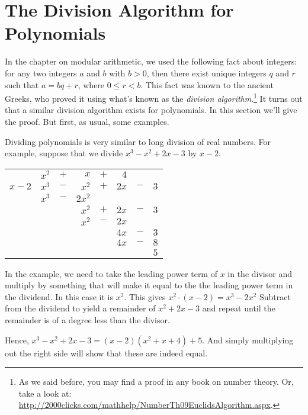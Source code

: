 \section{The Division Algorithm for Polynomials}
In the chapter on modular arithmetic, we used the following fact about integers: for any two integers $a$ and $b$  with $b > 0$, then there exist unique
integers $q$ and $r$ such that $a = bq+r$, where $0 \leq r < b$. This fact was known to the ancient Greeks, who proved it using what's known as the \emph{division algorithm}.\footnote{As we said before, you may find a proof in any book on number theory. Or, take a look at:  \url{http://2000clicks.com/mathhelp/NumberTh09EuclidsAlgorithm.aspx}.} It turns out that a similar
division algorithm exists for
polynomials. In this section we'll  give the proof. But first, as usual, some examples.

\begin{example}\label{example:poly:poly_division} 
Dividing polynomials is very similar to long division of real numbers.  
 For example,
suppose that we divide $x^3 - x^2 + 2 x - 3$ by $x - 2$.  
\begin{center}
\begin{tabular}{rrcrcrcr}
        &  $x^2$  &  $+$  &      $x$  &  $+$  &    $4$  &       &       \\ \cline{2-8}
 \multicolumn{1}{r|}{$x - 2$}
        &  $x^3$  &  $-$  &    $x^2$  &  $+$  &  $2 x$  &  $-$  &  $3$  \\
        &  $x^3$  &  $-$  &  $2 x^2$  &       &         &       &       \\ \cline{2-8}
        &         &       &    $x^2$  &  $+$  &  $2 x$  &  $-$  &  $3$  \\
        &         &       &    $x^2$  &  $-$  &  $2 x$  &       &       \\ \cline{4-8}
        &         &       &           &       &  $4 x$  &  $-$  &  $3$  \\
        &         &       &           &       &  $4 x$  &  $-$  &  $8$  \\ \cline{6-8}
        &         &       &           &       &         &       &  $5$
\end{tabular}
\end{center}
In the example, we need to take the leading power term of $x$ in the divisor and multiply by something that will make it equal to the the leading power term in the dividend.  In this case it is $x^2$.  This gives $x^2\cdot(x-2) = x^3 - 2x^2$  Subtract from the dividend to yield a remainder of $x^2 + 2x - 3$ and repeat until the remainder is of a degree less than the divisor.
 
Hence, $x^3 - x^2 + 2 x - 3 = (x - 2) (x^2 + x + 4 ) + 5$.  And simply multiplying out the right side will show that these are indeed equal.
\end{example}

